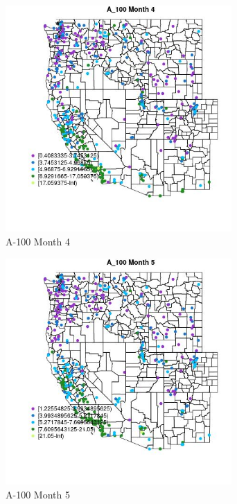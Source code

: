 \begin{figure} 
\centering  
\includegraphics[width=0.77\textwidth]{Code_Outputs/ML_input_report_ML_input_PM25_Step5_part_d_de_duplicated_aves_ML_input_MapObsMo4A_100.jpg} 
\caption{\label{fig:ML_input_report_ML_input_PM25_Step5_part_d_de_duplicated_aves_ML_inputMapObsMo4A_100}A-100 Month 4} 
\end{figure} 
 

\begin{figure} 
\centering  
\includegraphics[width=0.77\textwidth]{Code_Outputs/ML_input_report_ML_input_PM25_Step5_part_d_de_duplicated_aves_ML_input_MapObsMo5A_100.jpg} 
\caption{\label{fig:ML_input_report_ML_input_PM25_Step5_part_d_de_duplicated_aves_ML_inputMapObsMo5A_100}A-100 Month 5} 
\end{figure} 
 

